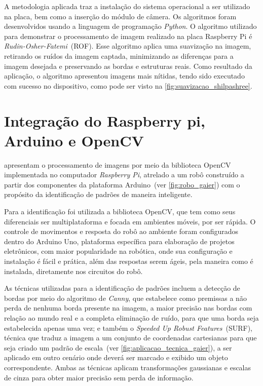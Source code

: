 \documentclass[12pt,oneside,a4paper,chapter=TITLE,section=TITLE,sumario=tradicional]{abntex2}
\begin{document}
A metodologia aplicada traz a instalação do sistema operacional a ser utilizado na placa, bem como a inserção do módulo de câmera. Os algoritmos foram desenvolvidos usando a linguagem de programação \textit{Python}. O algoritmo utilizado para demonstrar o processamento de imagem realizado na placa Raspberry Pi é \textit{Rudin-Osher-Fatemi}~(ROF). Esse algoritmo aplica uma suavização na imagem, retirando os ruídos da imagem captada, minimizando as diferenças para a imagem desejada e preservando as bordas e estruturas reais. Como resultado da aplicação, o algoritmo apresentou imagens mais nítidas, tendo sido executado com sucesso no dispositivo, como pode ser visto na \autoref{fig:suavizacao_shilpashree}.

\begin{figure}[htb]
\end{figure}

\section{Integração do Raspberry pi, Arduino e OpenCV}

 apresentam o processamento de imagens por meio da biblioteca OpenCV implementada no computador \textit{Raspberry Pi}, atrelado a um robô construído a partir dos componentes da plataforma Arduino~(ver \autoref{fig:robo_gaier}) com o propósito da identificação de padrões de maneira inteligente.

\begin{figure}[htb]
\end{figure}

Para a identificação foi utilizada a biblioteca OpenCV, que tem como seus diferenciais ser multiplataforma e focada em ambientes móveis, por ser rápida. O controle de movimentos e resposta do robô ao ambiente foram configurados dentro do Arduino Uno, plataforma específica para elaboração de projetos eletrônicos, com maior popularidade na robótica, onde sua configuração e instalação é fácil e prática, além das respostas serem ágeis, pela maneira como é instalada, diretamente nos circuitos do robô.

As técnicas utilizadas para a identificação de padrões incluem a detecção de bordas por meio do algoritmo de \textit{Canny}, que estabelece como premissas a não perda de nenhuma borda presente na imagem, a maior precisão nas bordas com relação ao mundo real e a completa eliminação de ruído, para que uma borda seja estabelecida apenas uma vez; e também o \textit{Speeded Up Robust Features}~(SURF), técnica que traduz a imagem a um conjunto de coordenadas cartesianas para que seja criado um padrão de escala~(ver \autoref{fig:aplicacao_tecnica_gaier}), a ser aplicado em outro cenário onde deverá ser marcado e exibido um objeto correspondente. Ambas as técnicas aplicam transformações gaussianas e escalas de cinza para obter maior precisão sem perda de informação.
\end{document}
